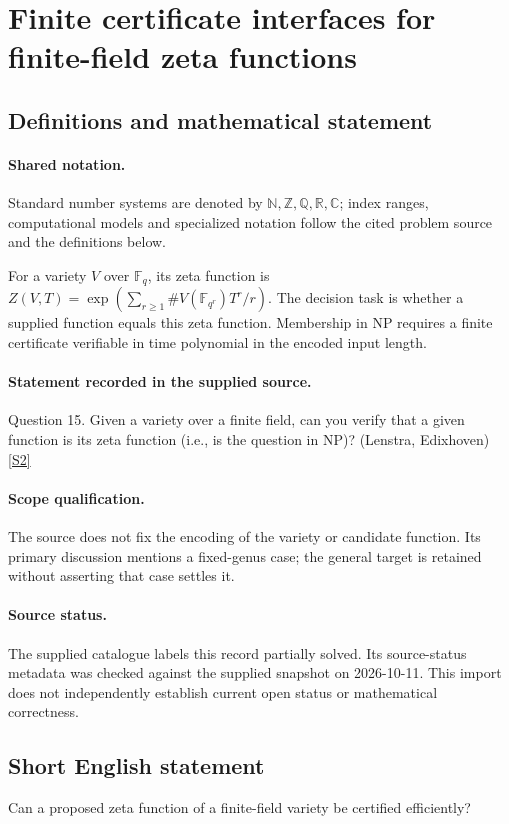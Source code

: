 \documentclass[11pt]{article}
\newcommand{\sref}[2]{\hyperlink{source:#1:#2}{[S#2]}}
\begin{document}
\section{Finite certificate interfaces for finite-field zeta functions}\label{statement}

\subsection{Definitions and mathematical statement}

\paragraph{Shared notation.}Standard number systems are denoted by $\mathbb N,\mathbb Z,\mathbb Q,\mathbb R,\mathbb C$; index ranges, computational models and specialized notation follow the cited problem source and the definitions below.


For a variety $V$ over $\mathbb F_q$, its zeta function is $Z(V,T)=\exp(\sum_{r\ge1}\#V(\mathbb F_{q^r})T^r/r)$. The decision task is whether a supplied function equals this zeta function. Membership in NP requires a finite certificate verifiable in time polynomial in the encoded input length.
\paragraph{Statement recorded in the supplied source.}
Question 15. Given a variety over a finite field, can you verify that a given function is its zeta function (i.e., is the question in NP)? (Lenstra, Edixhoven) \sref{statement}{2}
\paragraph{Scope qualification.}
The source does not fix the encoding of the variety or candidate function. Its primary discussion mentions a fixed-genus case; the general target is retained without asserting that case settles it.
\paragraph{Source status.}
The supplied catalogue labels this record partially solved. Its source-status metadata was checked against the supplied snapshot on 2026-10-11. This import does not independently establish current open status or mathematical correctness.
\subsection{Short English statement}
Can a proposed zeta function of a finite-field variety be certified efficiently?
\end{document}
